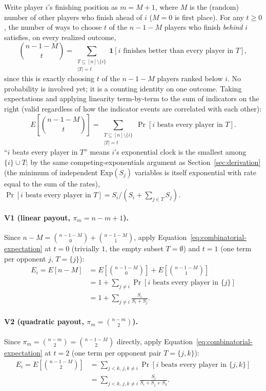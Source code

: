 \documentclass[11pt]{article}
\begin{document}
Write player $i$'s finishing position as $m = M + 1$, where $M$ is the
(random) number of other players who finish ahead of $i$ ($M = 0$ is first
place). For any $t \ge 0$, the number of ways to choose $t$ of the
$n - 1 - M$ players who finish \emph{behind} $i$ satisfies, on every
realized outcome,
\begin{equation}\label{eq:combinatorial-identity}
  \binom{n-1-M}{t} = \sum_{\substack{T \subseteq [n]\setminus\{i\} \\ |T| = t}}
  \mathbf{1}[i \text{ finishes better than every player in } T],
\end{equation}
since this is exactly choosing $t$ of the $n-1-M$ players ranked below $i$.
No probability is involved yet; it is a counting identity on one outcome.
Taking expectations and applying linearity term-by-term to the sum of
indicators on the right (valid regardless of how the indicator events are
correlated with each other):
\begin{equation}\label{eq:combinatorial-expectation}
  E\!\left[\binom{n-1-M}{t}\right] = \sum_{\substack{T \subseteq [n]\setminus\{i\} \\ |T|=t}}
  \Pr[i \text{ beats every player in } T].
\end{equation}
``$i$ beats every player in $T$'' means $i$'s exponential clock is the
smallest among $\{i\} \cup T$; by the same competing-exponentials argument
as Section~\ref{sec:derivation} (the minimum of independent
$\mathrm{Exp}(S_j)$ variables is itself exponential with rate equal to the
sum of the rates), $\Pr[i \text{ beats every player in } T] = S_i /
(S_i + \sum_{j \in T} S_j)$.

\paragraph{V1 (linear payout, $\pi_m = n - m + 1$).} Since $n - M =
\binom{n-1-M}{0} + \binom{n-1-M}{1}$, apply Equation~\ref{eq:combinatorial-expectation}
at $t=0$ (trivially $1$, the empty subset $T = \emptyset$) and $t=1$ (one
term per opponent $j$, $T = \{j\}$):
\begin{align*}
  E_i = E[n - M]
  &= E\!\left[\binom{n-1-M}{0}\right] + E\!\left[\binom{n-1-M}{1}\right] \\
  &= 1 + \sum_{j \neq i} \Pr[i \text{ beats every player in } \{j\}] \\
  &= 1 + \sum_{j \neq i} \frac{S_i}{S_i + S_j}.
\end{align*}

\paragraph{V2 (quadratic payout, $\pi_m = \binom{n-m}{2}$).} Since
$\pi_m = \binom{n-m}{2} = \binom{n-1-M}{2}$ directly, apply
Equation~\ref{eq:combinatorial-expectation} at $t=2$ (one term per opponent
pair $T = \{j,k\}$):
\begin{align*}
  E_i = E\!\left[\binom{n-1-M}{2}\right]
  &= \sum_{j < k,\, j,k \neq i} \Pr[i \text{ beats every player in } \{j,k\}] \\
  &= \sum_{j < k,\, j,k \neq i} \frac{S_i}{S_i + S_j + S_k}.
\end{align*}
\end{document}
